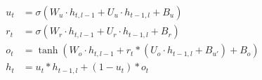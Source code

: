 \documentclass{article}
\begin{document}
\begin{align*}
    u_{t} &= \sigma(W_{u} \cdot h_{t,l-1} + U_{u} \cdot h_{t-1,l} + B_{u}) \\
	r_{t} &= \sigma(W_{r} \cdot h_{t,l-1} + U_{r} \cdot h_{t-1,l} + B_{r}) \\
	o_{t} &= \tanh(W_{o} \cdot h_{t,l-1} + r_{t} * (U_{o} \cdot h_{t-1,l} + B_{u'}) + B_{o}) \\
	h_{t} &= u_{t} * h_{t-1,l} + (1 - u_{t}) * o_{t}
\end{align*}
\end{document}
